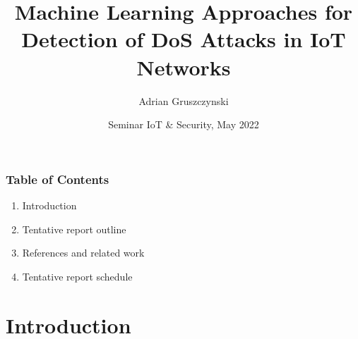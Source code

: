 \documentclass{beamer}
\title[Machine Learning Approaches for Detection of DoS Attacks in IoT Networks] %
{Machine Learning Approaches for Detection of DoS Attacks in IoT Networks}
\subtitle{}
\author[Adrian Gruszczynski] %
{Adrian Gruszczynski}
\institute[Freie Universität Berlin] %
{
  Institute of Computer Science\\
  Freie Universität Berlin
}
\date[2022] %
{Seminar IoT \& Security, May 2022}
\begin{document}
\frame{\titlepage}
%
%
%
    \begin{frame}
        \frametitle{Table of Contents}
        \begin{enumerate}
            \item Introduction
            \item Tentative report outline
            \item References and related work
            \item Tentative report schedule
        \end{enumerate}
    \end{frame}

\section{Introduction}

\end{document}
